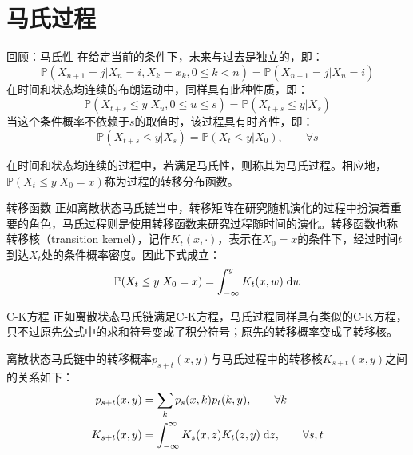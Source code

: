 \documentclass[t]{beamer}
\newcommand{\dif}{{\;\rm d}}
\renewcommand{\Pr}{\mathbb{P}}
\begin{document}
\section{马氏过程}
\begin{frame}{回顾：马氏性}
  在给定当前的条件下，未来与过去是独立的，即：
  \begin{equation*}
  \Pr(X_{n+1}=j|X_n=i, X_k=x_k, 0\le k< n)=\Pr(X_{n+1}=j|X_n=i)
  \end{equation*}
  在时间和状态均连续的布朗运动中，同样具有此种性质，即：
  \begin{equation*}
  \Pr(X_{t+s}\le y|X_u, 0\le u\le s)=\Pr(X_{t+s}\le y|X_s)
  \end{equation*}
  当这个条件概率不依赖于$s$的取值时，该过程具有时齐性，即：
  \begin{equation*}
  \Pr(X_{t+s}\le y|X_s)=\Pr(X_{t}\le y|X_0),\qquad \forall s
  \end{equation*}

  \begin{block}{}
    在时间和状态均连续的过程中，若满足马氏性，则称其为马氏过程。相应地，$\Pr(X_{t}\le y|X_0=x)$称为过程的转移分布函数。
  \end{block}
\end{frame}


\begin{frame}{转移函数}
  正如离散状态马氏链当中，转移矩阵在研究随机演化的过程中扮演着重要的角色，马氏过程则是使用转移函数来研究过程随时间的演化。转移函数也称
  转移核（transition kernel），记作$K_t(x,\cdot )$，表示在$X_0=x$的条件下，经过时间$t$到达$X_t$处的条件概率密度。因此下式成立：
  \begin{equation*}
  \Pr(X_{t}\le y|X_0=x)=\int^{y}_{-\infty} K_t(x,w)\dif w
  \end{equation*}
\end{frame}


\begin{frame}{C-K方程}
  正如离散状态马氏链满足C-K方程，马氏过程同样具有类似的C-K方程，只不过原先公式中的求和符号变成了积分符号；原先的转移概率变成了转移核。
  
  离散状态马氏链中的转移概率$p_{s+t}(x,y)$与马氏过程中的转移核$K_{s+t}(x,y)$之间的关系如下：
  \begin{align*}
  p_{s+t}(x,y)&=\sum_k p_s(x,k)p_t(k,y), \qquad \forall k\\
  K_{s+t}(x,y)&=\int_{-\infty}^{\infty}K_s(x,z)K_t(z,y)\dif z, \qquad \forall s,t
  \end{align*}
\end{frame}
\end{document}
